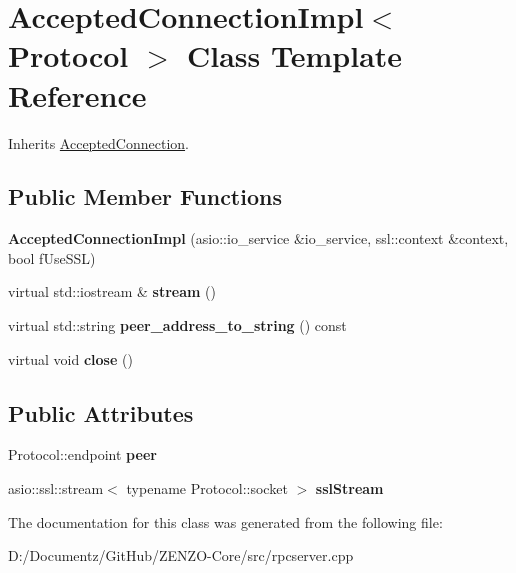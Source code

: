 \hypertarget{class_accepted_connection_impl}{}\section{Accepted\+Connection\+Impl$<$ Protocol $>$ Class Template Reference}
\label{class_accepted_connection_impl}


Inherits \mbox{\hyperlink{class_accepted_connection}{Accepted\+Connection}}.

\subsection*{Public Member Functions}
\begin{DoxyCompactItemize}
\item 
\mbox{\label{class_accepted_connection_impl_adaf674801c89a76de0bbb4154f2cf3b8}} 
{\bfseries Accepted\+Connection\+Impl} (asio\+::io\+\_\+service \&io\+\_\+service, ssl\+::context \&context, bool f\+Use\+S\+SL)
\item 
\mbox{\label{class_accepted_connection_impl_ab15396a413e40f947b7d527a2afe37fa}} 
virtual std\+::iostream \& {\bfseries stream} ()
\item 
\mbox{\label{class_accepted_connection_impl_ac9842ed342c2cbabb9c0dc4f7e1e9d0a}} 
virtual std\+::string {\bfseries peer\+\_\+address\+\_\+to\+\_\+string} () const
\item 
\mbox{\label{class_accepted_connection_impl_a1b114863c047cae57ce42564f9a29be1}} 
virtual void {\bfseries close} ()
\end{DoxyCompactItemize}
\subsection*{Public Attributes}
\begin{DoxyCompactItemize}
\item 
\mbox{\label{class_accepted_connection_impl_ade939b7d2778690cf78a9f6719f47c76}} 
Protocol\+::endpoint {\bfseries peer}
\item 
\mbox{\label{class_accepted_connection_impl_afcfc99c020d301985bc19b4075fc7e78}} 
asio\+::ssl\+::stream$<$ typename Protocol\+::socket $>$ {\bfseries ssl\+Stream}
\end{DoxyCompactItemize}


The documentation for this class was generated from the following file\+:\begin{DoxyCompactItemize}
\item 
D\+:/\+Documentz/\+Git\+Hub/\+Z\+E\+N\+Z\+O-\/\+Core/src/rpcserver.\+cpp\end{DoxyCompactItemize}
